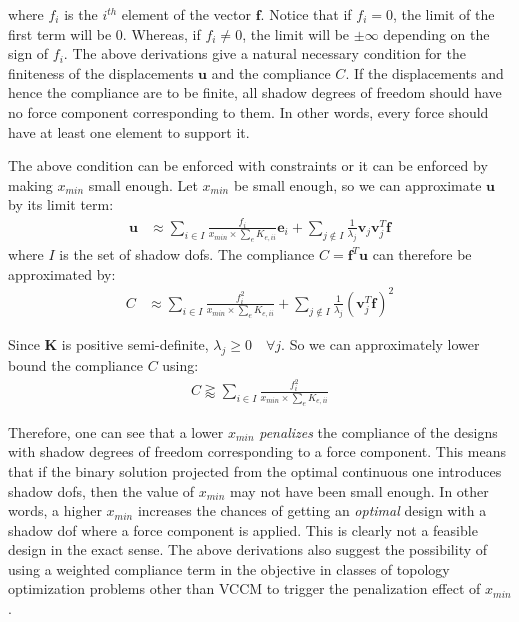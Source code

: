   where $f_i$ is the $i^{th}$ element of the vector $\bm{f}$. Notice that if $f_i = 0$, the limit of the first term will be 0. Whereas, if $f_i \neq 0$, the limit will be $\pm \infty$ depending on the sign of $f_i$. The above derivations give a natural necessary condition for the finiteness of the displacements $\bm{u}$ and the compliance $C$. If the displacements and hence the compliance are to be finite, all shadow degrees of freedom should have no force component corresponding to them. In other words, every force should have at least one element to support it.

  The above condition can be enforced with constraints or it can be enforced by making $x_{min}$ small enough. Let $x_{min}$ be small enough, so we can approximate $\bm{u}$ by its limit term:
  \begin{align}
    \bm{u} & \approx \sum_{i \in I} \frac{f_i}{x_{min} \times \sum_e K_{e,ii}} \bm{e}_i + \sum_{j \notin I} \frac{1}{\lambda_j} \bm{v}_j \bm{v}_j^T \bm{f}
  \end{align}
  where $I$ is the set of shadow dofs. The compliance $C = \bm{f}^T \bm{u}$ can therefore be approximated by:
  \begin{align}
    C & \approx \sum_{i \in I} \frac{f^2_i}{x_{min} \times \sum_e K_{e,ii}} + \sum_{j \notin I} \frac{1}{\lambda_j} (\bm{v}_j^T \bm{f})^2
  \end{align}

  Since $\bm{K}$ is positive semi-definite, $\lambda_j \geq 0 \quad \forall j$. So we can approximately lower bound the compliance $C$ using:
  \begin{align}
    C \gtrapprox \sum_{i \in I} \frac{f^2_i}{x_{min} \times \sum_e K_{e,ii}}
  \end{align}

  Therefore, one can see that a lower $x_{min}$ \textit{penalizes} the compliance of the designs with shadow degrees of freedom corresponding to a force component. This means that if the binary solution projected from the optimal continuous one introduces shadow dofs, then the value of $x_{min}$ may not have been small enough. In other words, a higher $x_{min}$ increases the chances of getting an \textit{optimal} design with a shadow dof where a force component is applied. This is clearly not a feasible design in the exact sense. The above derivations also suggest the possibility of using a weighted compliance term in the objective in classes of topology optimization problems other than VCCM to trigger the penalization effect of $x_{min}$.

